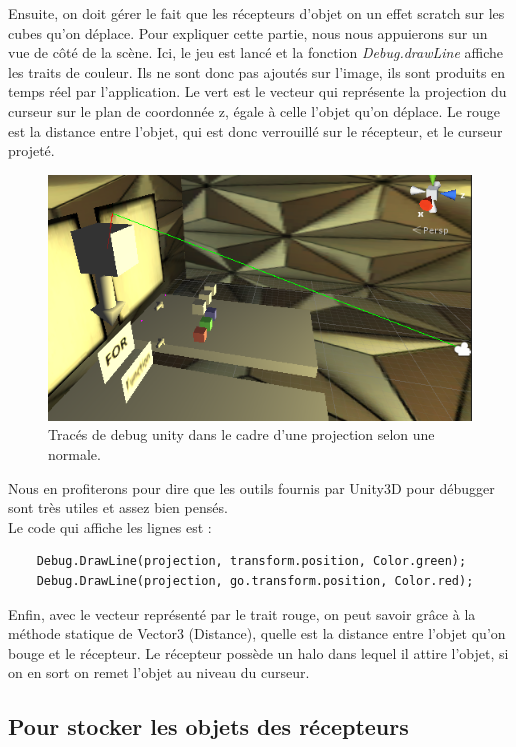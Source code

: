 \documentclass[a4paper,11pt]{myreport}
\begin{document}
	\par Ensuite, on doit gérer le fait que les récepteurs d'objet on un effet scratch sur les cubes qu'on déplace. Pour expliquer cette partie, nous nous appuierons sur un vue de côté de la scène. Ici, le jeu est lancé et la fonction \textit{Debug.drawLine} affiche les traits de couleur. Ils ne sont donc pas ajoutés sur l'image, ils sont produits en temps réel par l'application. Le vert est le vecteur qui représente la projection du curseur sur le plan de coordonnée z, égale à celle l'objet qu'on déplace. Le rouge est la distance entre l'objet, qui est donc verrouillé sur le récepteur, et le curseur projeté.
	
	\begin{figure}[h]
	\includegraphics[scale=0.90]{./images/projection.png}
	\caption{Tracés de debug unity dans le cadre d'une projection selon une normale.}
	\end{figure}
	Nous en profiterons pour dire que les outils fournis par Unity3D pour débugger sont très utiles et assez bien pensés. \\Le code qui affiche les lignes est :
\lstset{style=sharpc}
	\begin{lstlisting}
	Debug.DrawLine(projection, transform.position, Color.green);
	Debug.DrawLine(projection, go.transform.position, Color.red);
	\end{lstlisting}
	\par Enfin, avec le vecteur représenté par le trait rouge, on peut savoir grâce à la méthode statique de Vector3 (Distance), quelle est la distance entre l'objet qu'on bouge et le récepteur. Le récepteur possède un halo dans lequel il attire l'objet, si on en sort on remet l'objet au niveau du curseur.
	\subsection{Pour stocker les objets des récepteurs}
	
\end{document}
